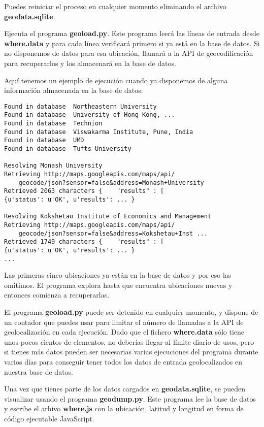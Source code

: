 Puedes reiniciar el proceso en cualquier momento eliminando el archivo
{\bf geodata.sqlite}.

Ejecuta el programa {\bf geoload.py}. Este programa leerá las líneas
de entrada desde {\bf where.data} y para cada línea verificará primero si ya
está en la base de datos. Si no disponemos de datos para esa ubicación,
llamará a la API de geocodificación para recuperarlos y los almacenará
en la base de datos.

Aquí tenemos un ejemplo de ejecución cuando ya disponemos de alguna información almacenada en la
base de datos:

\beforeverb
\begin{verbatim}
Found in database  Northeastern University
Found in database  University of Hong Kong, ...
Found in database  Technion
Found in database  Viswakarma Institute, Pune, India
Found in database  UMD
Found in database  Tufts University

Resolving Monash University
Retrieving http://maps.googleapis.com/maps/api/
    geocode/json?sensor=false&address=Monash+University
Retrieved 2063 characters {    "results" : [  
{u'status': u'OK', u'results': ... }

Resolving Kokshetau Institute of Economics and Management
Retrieving http://maps.googleapis.com/maps/api/
    geocode/json?sensor=false&address=Kokshetau+Inst ...
Retrieved 1749 characters {    "results" : [  
{u'status': u'OK', u'results': ... }
...
\end{verbatim}
\afterverb
%
Las primeras cinco ubicaciones ya están en la base de datos y por eso
las omitimos. El programa explora hasta que encuentra ubicaciones
nuevas y entonces comienza a recuperarlas.

El programa {\bf geoload.py} puede ser detenido en cualquier momento, y dispone de un
contador que puedes usar para limitar el número de llamadas a la API de geolocalización
en cada ejecución. Dado que el fichero {\bf where.data} sólo tiene unos pocos cientos
de elementos, no deberías llegar al límite diario de usos, pero si
tienes más datos pueden ser necesarias varias ejecuciones del programa durante varios días
para conseguir tener todos los datos de entrada geolocalizados en nuestra base de datos.

Una vez que tienes parte de los datos cargados en {\bf geodata.sqlite}, se pueden
visualizar usando el programa {\bf geodump.py}. Este
programa lee la base de datos y escribe el arhivo {\bf where.js}
con la ubicación, latitud y longitud en forma de
código ejecutable JavaScript.

